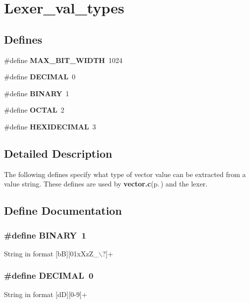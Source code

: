 \section{Lexer\_\-val\_\-types}
\label{group__lexer__val__types}
\subsection*{Defines}
\begin{CompactItemize}
\item 
\#define {\bf MAX\_\-BIT\_\-WIDTH}\ 1024
\item 
\#define {\bf DECIMAL}\ 0
\item 
\#define {\bf BINARY}\ 1
\item 
\#define {\bf OCTAL}\ 2
\item 
\#define {\bf HEXIDECIMAL}\ 3
\end{CompactItemize}


\subsection{Detailed Description}
The following defines specify what type of vector value can be extracted from a value string. These defines are used by {\bf vector.c}{\rm (p.\,\pageref{vector_8c})} and the lexer. 

\subsection{Define Documentation}
\subsubsection{\setlength{\rightskip}{0pt plus 5cm}\#define BINARY\ 1}\label{group__lexer__val__types_a2}


String in format [b\-B][01x\-Xz\-Z\_\-$\backslash$?]+ 
\subsubsection{\setlength{\rightskip}{0pt plus 5cm}\#define DECIMAL\ 0}\label{group__lexer__val__types_a1}


String in format [d\-D][0-9]+ 
